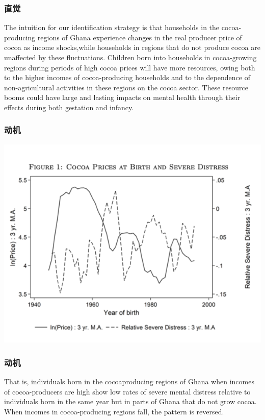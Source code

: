 \documentclass{beamer}
\begin{document}
\begin{frame}
	\frametitle{直觉}
	The intuition for our identiﬁcation strategy is that households in the cocoa-producing regions of Ghana experience changes in the real producer price of cocoa as income shocks,while households in regions that do not produce cocoa are unaﬀected by these ﬂuctuations. Children born into households in cocoa-growing regions during periods of high cocoa prices will have more resources, owing both to the higher incomes of cocoa-producing households and to the dependence of non-agricultural activities in these regions on the cocoa sector. These resource booms could have large and lasting impacts on mental health through their eﬀects during both gestation and infancy.
\end{frame}

\begin{frame}
	\frametitle{动机}
	\centering
	\includegraphics[scale=0.5]{figure1}
\end{frame}

\begin{frame}
	\frametitle{动机}
	That is, individuals born in the cocoaproducing regions of Ghana when incomes of cocoa-producers are high show low rates of severe mental distress relative to individuals born in the same year but in parts of Ghana that do not grow cocoa. When incomes in cocoa-producing regions fall, the pattern is reversed.
\end{frame}
\end{document}
